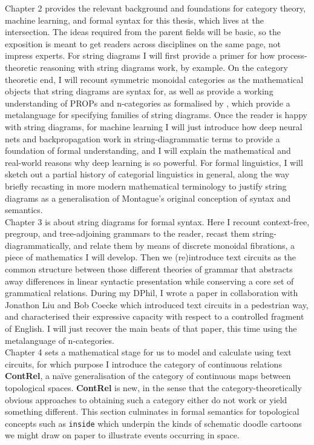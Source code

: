 Chapter 2 provides the relevant background and foundations for category theory, machine learning, and formal syntax for this thesis, which lives at the intersection. The ideas required from the parent fields will be basic, so the exposition is meant to get readers across disciplines on the same page, not impress experts. For string diagrams I will first provide a primer for how process-theoretic reasoning with string diagrams work, by example. On the category theoretic end, I will recount symmetric monoidal categories as the mathematical objects that string diagrams are syntax for, as well as provide a working understanding of PROPs \citep{} and n-categories as formalised by \citep{}, which provide a metalanguage for specifying families of string diagrams. Once the reader is happy with string diagrams, for machine learning I will just introduce how deep neural nets and backpropagation work in string-diagrammatic terms to provide a foundation of formal understanding, and I will explain the mathematical and real-world reasons why deep learning is so powerful. For formal linguistics, I will sketch out a partial history of categorial linguistics in general, along the way briefly recasting \citep{} in more modern mathematical terminology to justify string diagrams as a generalisation of Montague's original conception of syntax and semantics.\\

Chapter 3 is about string diagrams for formal syntax. Here I recount context-free, pregroup, and tree-adjoining grammars to the reader, recast them string-diagrammatically, and relate them by means of discrete monoidal fibrations, a piece of mathematics I will develop. Then we (re)introduce text circuits as the common structure between those different theories of grammar that abstracts away differences in linear syntactic presentation while conserving a core set of grammatical relations. During my DPhil, I wrote a paper \citep{} in collaboration with Jonathon Liu and Bob Coecke which introduced text circuits in a pedestrian way, and characterised their expressive capacity with respect to a controlled fragment of English. I will just recover the main beats of that paper, this time using the metalanguage of n-categories.\\

Chapter 4 sets a mathematical stage for us to model and calculate using text circuits, for which purpose I introduce the category of continuous relations \textbf{ContRel}, a na\"{i}ve generalisation of the category of continuous maps between topological spaces. \textbf{ContRel} is new, in the sense that the category-theoretically obvious approaches to obtaining such a category either do not work or yield something different. This section culminates in formal semantics for topological concepts such as \texttt{inside} which underpin the kinds of schematic doodle cartoons we might draw on paper to illustrate events occurring in space.\\

